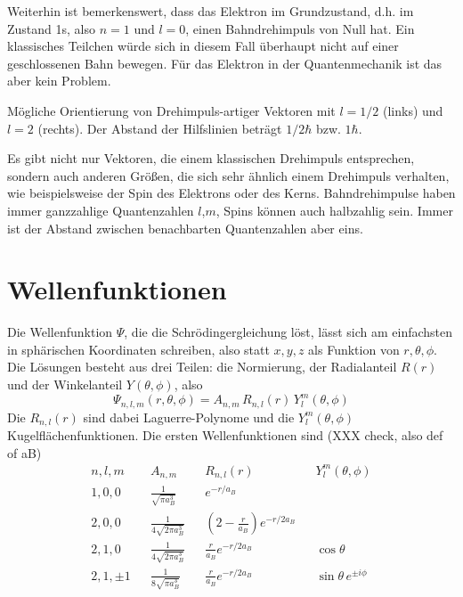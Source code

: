 Weiterhin ist bemerkenswert, dass das Elektron im Grundzustand, d.h. im Zustand 1s, also $n=1$ und $l=0$, einen Bahndrehimpuls von Null hat. Ein klassisches Teilchen würde sich in diesem Fall überhaupt nicht auf einer geschlossenen Bahn bewegen. Für das Elektron in der Quantenmechanik ist das aber kein Problem.

\begin{marginfigure}
    \caption{Mögliche Orientierung von  Drehimpuls-artiger Vektoren mit $l=1/2$ (links) und $l=2$ (rechts). Der Abstand der Hilfslinien beträgt $1/2 \hbar$ bzw. $1\hbar$.}
\end{marginfigure}

Es gibt nicht nur Vektoren, die einem klassischen Drehimpuls entsprechen, sondern auch anderen Größen, die sich sehr ähnlich einem Drehimpuls verhalten, wie beispielsweise der Spin des Elektrons oder des Kerns. Bahndrehimpulse haben immer ganzzahlige Quantenzahlen $l$,$m$, Spins können auch halbzahlig sein. Immer ist der Abstand zwischen benachbarten Quantenzahlen aber eins. 



\section{Wellenfunktionen}

Die Wellenfunktion $\Psi$, die die Schrödingergleichung löst, lässt sich am einfachsten in sphärischen Koordinaten schreiben, also statt $x,y,z$ als Funktion von $r,  \theta,\phi$. Die Lösungen besteht aus   drei Teilen: die Normierung, der Radialanteil $R(r)$ und der Winkelanteil $Y(\theta, \phi)$, also 
\begin{equation}
    \Psi_{n,l,m} (r, \theta, \phi) = A_{n,m} \, R_{n,l}(r) \, Y_l^m (\theta, \phi)
\end{equation}
Die $R_{n,l}(r)$ sind dabei Laguerre-Polynome und die $Y_l^m(\theta, \phi)$ Kugelflächenfunktionen.
Die ersten Wellenfunktionen sind (XXX check, also def of aB)
\begin{align}
    n,l,m  & & A_{n,m}                      & &R_{n,l}(r) & & Y_l^m(\theta, \phi) \\
   1,0,0   && \frac{1}{\sqrt{\pi a_B^3}}    & &e^{-r / a_B} && \\
    2,0,0  & & \frac{1}{4 \sqrt{2 \pi a_B^3}}   & & \left( 2 - \frac{r}{a_B}\right) e^{-r /2 a_B} && \\
    2,1,0  & & \frac{1}{4 \sqrt{2 \pi a_B^3}}   & & \frac{r}{a_B} e^{-r /2 a_B} && \cos \theta \\
    2,1,\pm 1  & & \frac{1}{8 \sqrt{\pi a_B^3}}   & & \frac{r}{a_B} e^{-r /2 a_B} && \sin \theta \, e^{\pm i \phi} 
\end{align}


